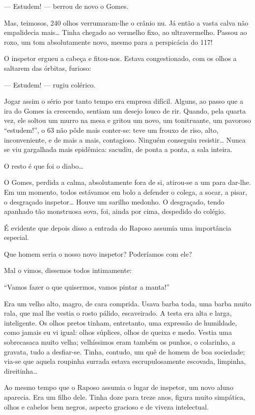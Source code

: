 --- Estudem! --- berrou de novo o Gomes.

Mas, teimosos, 240 olhos verrumaram-lhe o crânio nu. Já então a vasta
calva não empalidecia mais\ldots{} Tinha chegado ao vermelho fixo, ao
ultravermelho. Passou ao roxo, um tom absolutamente novo, mesmo para a
perspicácia do 117!

O inspetor ergueu a cabeça e fitou-nos. Estava congestionado, com os
olhos a saltarem das órbitas, furioso:

--- Estudem! --- rugiu colérico.

Jogar assim o sério por tanto tempo era empresa difícil. Alguns, ao
passo que a ira do Gomes ia crescendo, sentiam um desejo louco de rir.
Quando, pela quarta vez, ele soltou um murro na mesa e gritou um novo,
um tonitruante, um pavoroso ``estudem!'', o 63 não pôde mais conter-se:
teve um frouxo de riso, alto, inconveniente, e de mais a mais,
contagioso. Ninguém conseguiu resistir\ldots{} Nunca se viu gargalhada mais
epidêmica: sacudiu, de ponta a ponta, a sala inteira.

O resto é que foi o diabo\ldots{}

O Gomes, perdida a calma, absolutamente fora de si, atirou-se a um para
dar-lhe. Em um momento, todos estávamos em bolo a defender o colega, a
socar, a pisar, o desgraçado inspetor\ldots{} Houve um sarilho medonho. O
desgraçado, tendo apanhado tão monstruosa sova, foi, ainda por cima,
despedido do colégio.

É evidente que depois disso a entrada do Raposo assumia uma importância
especial.

Que homem seria o nosso novo inspetor? Poderíamos com ele?

Mal o vimos, dissemos todos intimamente:

``Vamos fazer o que quisermos, vamos pintar a manta!''

Era um velho alto, magro, de cara comprida. Usava barba toda, uma barba
muito rala, que mal lhe vestia o rosto pálido, escaveirado. A testa era
alta e larga, inteligente. Os olhos pretos tinham, entretanto, uma
expressão de humildade, como jamais eu vi igual: olhos súplices, olhos
de queixa e medo. Vestia uma sobrecasaca muito velha; velhíssimos eram
também os punhos, o colarinho, a gravata, tudo a desfiar-se. Tinha,
contudo, um quê de homem de boa sociedade; via-se que aquela roupinha
surrada estava escrupulosamente escovada, limpinha, direitinha\ldots{}

Ao mesmo tempo que o Raposo assumia o lugar de inspetor, um novo aluno
aparecia. Era um filho dele. Tinha doze para treze anos, figura muito
simpática, olhos e cabelos bem negros, aspecto gracioso e de viveza
intelectual.

